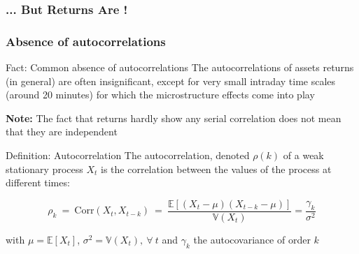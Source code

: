 \documentclass{beamer}
\begin{document}
\begin{frame}
\frametitle{... But Returns Are !}
\end{frame}


\begin{frame}
  \frametitle{Absence of autocorrelations}
  \begin{exampleblock}{Fact: Common absence of autocorrelations}
    The autocorrelations of assets returns (in general) are often insignificant, except for very small intraday time scales (around 20 minutes) for which the microstructure effects come into play
  \end{exampleblock}

\textbf{Note:} The fact that returns hardly show any serial correlation does not mean that they are independent


\begin{block}{Definition: Autocorrelation}
  The autocorrelation, denoted $\rho(k)$ of a weak stationary process $X_t$ is the correlation between the values of the process at different times:

  \begin{equation*}
    \rho_k \ = \ \text{Corr}(X_t, X_{t-k}) \ = \ \frac{\mathbb{E}\left[ (X_t - \mu)(X_{t-k} - \mu)\right]}{\mathbb{V}(X_t)} = \frac{\gamma_k}{\sigma^2}
  \end{equation*}

with $\mu = \mathbb{E}[X_t]$, $\sigma^2 = \mathbb{V}(X_t), \ \forall \ t$ and $\gamma_k$ the autocovariance of order $k$
  
\end{block}

\end{frame}
\end{document}
